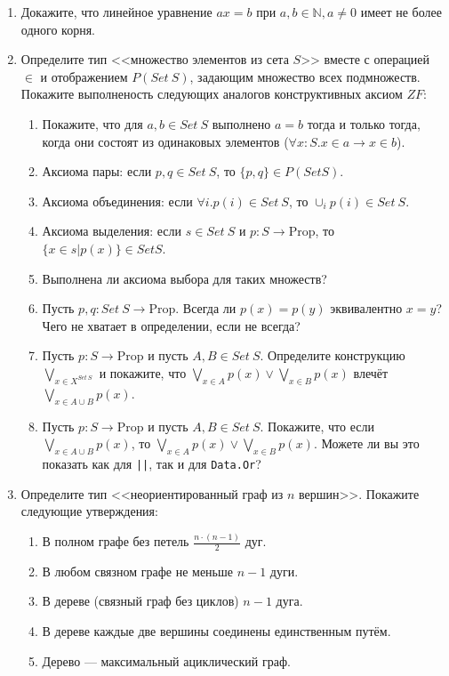 \documentclass[10pt,a4paper,oneside]{article}
\begin{document}
\begin{enumerate}
\item Докажите, что линейное уравнение $ax = b$ при $a,b \in \mathbb{N}, a \ne 0$ имеет не более одного корня.

\item Определите тип <<множество элементов из сета $S$>> вместе с операцией $\in$ и отображением $P(Set\ S)$, задающим множество всех подмножеств. 
Покажите выполненость следующих аналогов конструктивных аксиом $ZF$:
\begin{enumerate}
\item Покажите, что для $a,b \in Set\ S$ выполнено $a = b$ тогда и только тогда, когда они состоят из одинаковых элементов ($\forall x:S.x \in a \rightarrow x \in b$).
\item Аксиома пары: если $p,q \in Set\ S$, то $\{p,q\} \in P(Set S)$.
\item Аксиома объединения: если $\forall i.p(i) \in Set\ S$, то $\cup_i p(i) \in Set\ S$.
\item Аксиома выделения: если $s \in Set\ S$ и $p : S \rightarrow \text{Prop}$, то $\{ x\in s | p(x)\} \in Set S$.
\item Выполнена ли аксиома выбора для таких множеств?
\item Пусть $p,q: Set\ S \rightarrow \text{Prop}$. Всегда ли $p(x) = p(y)$ эквивалентно $x=y$? Чего не хватает в определении, если не всегда?
\item Пусть $p: S \rightarrow \text{Prop}$ и пусть $A,B \in Set\ S$. Определите конструкцию $\bigvee_{x \in X^{Set\ S}}$ и 
покажите, что $\bigvee_{x \in A} p(x) \vee \bigvee_{x \in B} p(x)$ влечёт $\bigvee_{x\in A\cup B} p(x)$. 
\item Пусть $p: S \rightarrow \text{Prop}$ и пусть $A,B \in Set\ S$. Покажите, что если $\bigvee_{x\in A\cup B} p(x)$, то $\bigvee_{x \in A} p(x) \vee \bigvee_{x \in B} p(x)$.
Можете ли вы это показать как для \verb!||!, так и для \verb!Data.Or!?
\end{enumerate}

\item Определите тип <<неориентированный граф из $n$ вершин>>. Покажите следующие утверждения:
\begin{enumerate}
\item В полном графе без петель $\frac{n\cdot(n-1)}{2}$ дуг.
\item В любом связном графе не меньше $n-1$ дуги.
\item В дереве (связный граф без циклов) $n-1$ дуга.
\item В дереве каждые две вершины соединены единственным путём.
\item Дерево --- максимальный ациклический граф.
\end{enumerate}
\end{enumerate}
\end{document}
